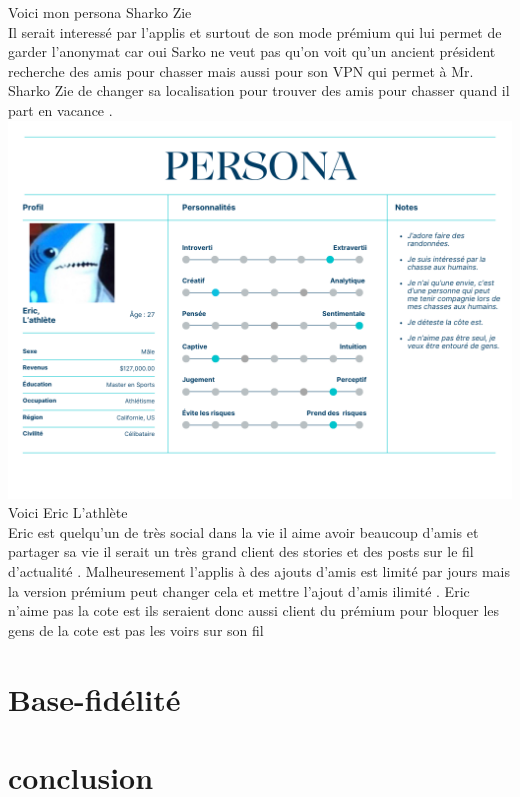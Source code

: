 \documentclass{article}
\begin{document}
Voici mon persona Sharko Zie \\

Il serait interessé par l'applis et surtout de son mode prémium qui lui permet de garder l'anonymat
car oui Sarko ne veut pas qu'on voit qu'un ancient président recherche des amis pour chasser mais aussi
pour son VPN qui permet à Mr. Sharko Zie de changer sa localisation pour trouver des amis pour chasser
quand il part en vacance . \\

\includegraphics[width=1\textwidth]{photo/Personna_Kaan.png}\\

Voici Eric L'athlète\\

Eric est quelqu'un de très social dans la vie il aime avoir beaucoup d'amis et partager sa vie il serait 
un très grand client des stories et des posts sur le fil d'actualité .  Malheuresement l'applis à des ajouts 
d'amis est limité par jours mais la version prémium peut changer cela et mettre l'ajout d'amis ilimité . 
Eric n'aime pas la cote est ils seraient donc aussi client du prémium pour bloquer les gens de la cote est 
pas les voirs sur son fil 







\section{Base-fidélité}


\section{conclusion}
\end{document}
